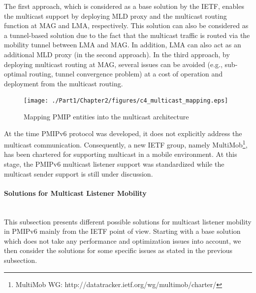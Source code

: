 The first approach, which is considered as a base solution by the IETF, enables the multicast support by deploying MLD proxy and the multicast routing function at MAG and LMA, respectively. This solution can also be considered as a tunnel-based solution due to the fact that the multicast traffic is routed via the mobility tunnel between LMA and MAG. In addition, LMA can also act as an additional MLD proxy (in the second approach). In the third approach, by deploying multicast routing at MAG, several issues can be avoided (e.g., sub-optimal routing, tunnel convergence problem) at a cost of operation and deployment from the multicast routing.
\begin{figure}[h!]
\centering
\texttt{[image: ./Part1/Chapter2/figures/c4\_multicast\_mapping.eps]}
\caption[Mapping PMIP entities into the multicast deployment architecture]{Mapping PMIP entities into the multicast architecture}
\label{fig:c4_mapping_pmip}
\end{figure}

At the time PMIPv6 protocol was developed, it does not explicitly address the multicast communication. Consequently, a new IETF group, namely MultiMob\footnote{MultiMob WG: http://datatracker.ietf.org/wg/multimob/charter/}, has been chartered for supporting multicast in a mobile environment. At this stage, the PMIPv6 multicast listener support was standardized while the multicast sender support is still under discussion. 

\paragraph{Solutions for Multicast Listener Mobility\\ \\ }
This subsection presents different possible solutions for multicast listener mobility in PMIPv6 mainly from the IETF point of view. Starting with a base solution which does not take any performance and optimization issues into account, we then consider the solutions for some specific issues as stated in the previous subsection. 

